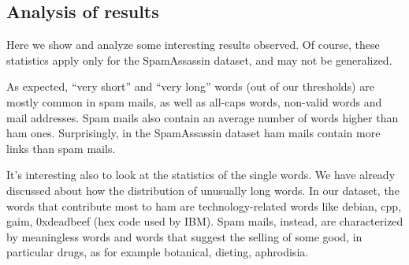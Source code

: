 \subsection{Analysis of results}
Here we show and analyze some interesting results observed. Of course, these statistics apply only for the SpamAssassin dataset, and may not be generalized.

As expected, ``very short'' and ``very long'' words (out of our thresholds) are mostly common in spam mails, as well as all-caps words, non-valid words and mail addresses. Spam mails also contain an average number of words higher than ham ones. Surprisingly, in the SpamAssassin dataset ham mails contain more links than spam mails.

It's interesting also to look at the statistics of the single words. We have already discussed about how the distribution of unusually long words. In our dataset, the words that contribute most to ham are technology-related words like debian, cpp, gaim, 0xdeadbeef (hex code used by \textsc{IBM}). Spam mails, instead, are characterized by meaningless words and words that suggest the selling of some good, in particular drugs, as for example botanical, dieting, aphrodisia.

